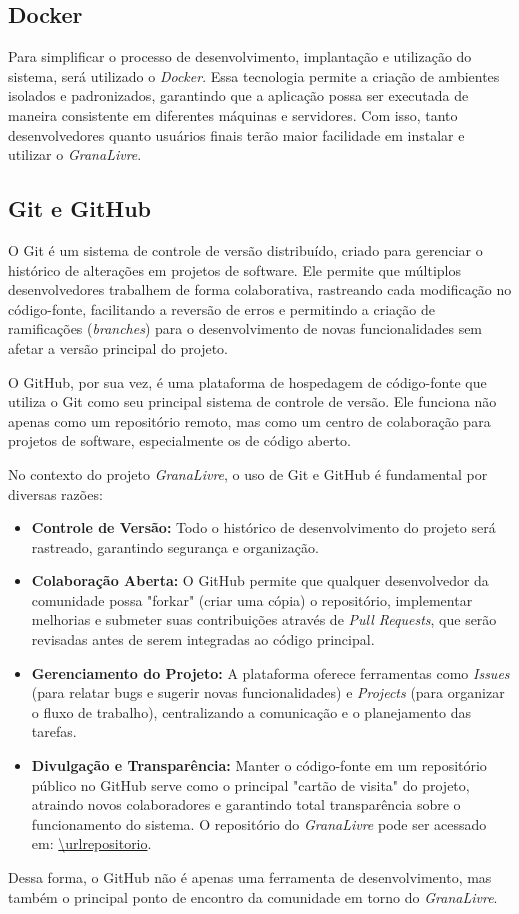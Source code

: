 \subsection{Docker}
Para simplificar o processo de desenvolvimento, implantação e utilização do sistema, será utilizado o \textit{Docker}. Essa tecnologia permite a criação de ambientes isolados e padronizados, garantindo que a aplicação possa ser executada de maneira consistente em diferentes máquinas e servidores.  
Com isso, tanto desenvolvedores quanto usuários finais terão maior facilidade em instalar e utilizar o \textit{GranaLivre}.

\subsection{Git e GitHub}
O Git é um sistema de controle de versão distribuído, criado para gerenciar o histórico de alterações em projetos de software. Ele permite que múltiplos desenvolvedores trabalhem de forma colaborativa, rastreando cada modificação no código-fonte, facilitando a reversão de erros e permitindo a criação de ramificações (\textit{branches}) para o desenvolvimento de novas funcionalidades sem afetar a versão principal do projeto.

O GitHub, por sua vez, é uma plataforma de hospedagem de código-fonte que utiliza o Git como seu principal sistema de controle de versão. Ele funciona não apenas como um repositório remoto, mas como um centro de colaboração para projetos de software, especialmente os de código aberto.

No contexto do projeto \textit{GranaLivre}, o uso de Git e GitHub é fundamental por diversas razões:
\begin{itemize}
\item \textbf{Controle de Versão:} Todo o histórico de desenvolvimento do projeto será rastreado, garantindo segurança e organização.
\item \textbf{Colaboração Aberta:} O GitHub permite que qualquer desenvolvedor da comunidade possa "forkar" (criar uma cópia) o repositório, implementar melhorias e submeter suas contribuições através de \textit{Pull Requests}, que serão revisadas antes de serem integradas ao código principal.
\item \textbf{Gerenciamento do Projeto:} A plataforma oferece ferramentas como \textit{Issues} (para relatar bugs e sugerir novas funcionalidades) e \textit{Projects} (para organizar o fluxo de trabalho), centralizando a comunicação e o planejamento das tarefas.
\item \textbf{Divulgação e Transparência:} Manter o código-fonte em um repositório público no GitHub serve como o principal "cartão de visita" do projeto, atraindo novos colaboradores e garantindo total transparência sobre o funcionamento do sistema. O repositório do \textit{GranaLivre} pode ser acessado em: \url{\urlrepositorio}.
\end{itemize}
Dessa forma, o GitHub não é apenas uma ferramenta de desenvolvimento, mas também o principal ponto de encontro da comunidade em torno do \textit{GranaLivre}.

